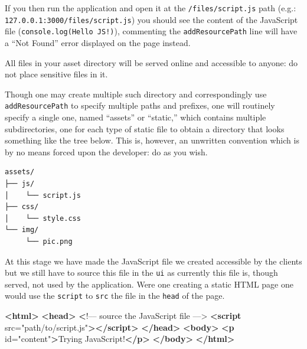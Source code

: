 \documentclass[
]{krantz}
\makeatletter
\newenvironment{Shaded}{\begin{snugshade}}{\end{snugshade}}
\newcommand{\ErrorTok}[1]{\textcolor[rgb]{0.14,0.14,0.14}{\textbf{#1}}}
\newcommand{\KeywordTok}[1]{\textcolor[rgb]{0.27,0.27,0.27}{\textbf{#1}}}
\newcommand{\NormalTok}[1]{#1}
\newcommand{\OtherTok}[1]{\textcolor[rgb]{0.37,0.37,0.37}{#1}}
\newcommand{\StringTok}[1]{\textcolor[rgb]{0.5,0.5,0.5}{#1}}
\newenvironment{kframe}{%
\medskip{}
\setlength{\fboxsep}{.8em}
 \def\at@end@of@kframe{}%
 \ifinner\ifhmode%
  \def\at@end@of@kframe{\end{minipage}}%
  \begin{minipage}{\columnwidth}%
 \fi\fi%
 \def\FrameCommand##1{\hskip\@totalleftmargin \hskip-\fboxsep
 \colorbox{shadecolor}{##1}\hskip-\fboxsep
     \hskip-\linewidth \hskip-\@totalleftmargin \hskip\columnwidth}%
 \MakeFramed {\advance\hsize-\width
   \@totalleftmargin\z@ \linewidth\hsize
   \@setminipage}}%
 {\par\unskip\endMakeFramed%
 \at@end@of@kframe}
\renewenvironment{Shaded}{\begin{kframe}}{\end{kframe}}
\makeatother
\begin{document}
If you then run the application and open it at the \texttt{/files/script.js} path (e.g.: \texttt{127.0.0.1:3000/files/script.js}) you should see the content of the JavaScript file (\texttt{console.log(\textquotesingle{}Hello\ JS!\textquotesingle{})}), commenting the \texttt{addResourcePath} line will have a ``Not Found'' error displayed on the page instead.

All files in your asset directory will be served online and accessible to anyone: do not place sensitive files in it.

Though one may create multiple such directory and correspondingly use \texttt{addResourcePath} to specify multiple paths and prefixes, one will routinely specify a single one, named ``assets'' or ``static,'' which contains multiple subdirectories, one for each type of static file to obtain a directory that looks something like the tree below. This is, however, an unwritten convention which is by no means forced upon the developer: do as you wish.

\begin{verbatim}
assets/
├── js/
│    └── script.js
├── css/
│    └── style.css
└── img/
     └── pic.png
\end{verbatim}

At this stage we have made the JavaScript file we created accessible by the clients but we still have to source this file in the \texttt{ui} as currently this file is, though served, not used by the application. Were one creating a static HTML page one would use the \texttt{script} to \texttt{src} the file in the \texttt{head} of the page.

\begin{Shaded}
\begin{Highlighting}[]
\KeywordTok{\textless{}html\textgreater{}}
  \KeywordTok{\textless{}head\textgreater{}}
    \ErrorTok{\textless{}}\NormalTok{!–– source the JavaScript file ––\textgreater{}}
    \KeywordTok{\textless{}script}\OtherTok{ src=}\StringTok{"path/to/script.js"}\KeywordTok{\textgreater{}\textless{}/script\textgreater{}}
  \KeywordTok{\textless{}/head\textgreater{}}
  \KeywordTok{\textless{}body\textgreater{}}
    \KeywordTok{\textless{}p}\OtherTok{ id=}\StringTok{"content"}\KeywordTok{\textgreater{}}\NormalTok{Trying JavaScript!}\KeywordTok{\textless{}/p\textgreater{}}
  \KeywordTok{\textless{}/body\textgreater{}}
\KeywordTok{\textless{}/html\textgreater{}}
\end{Highlighting}
\end{Shaded}
\end{document}
